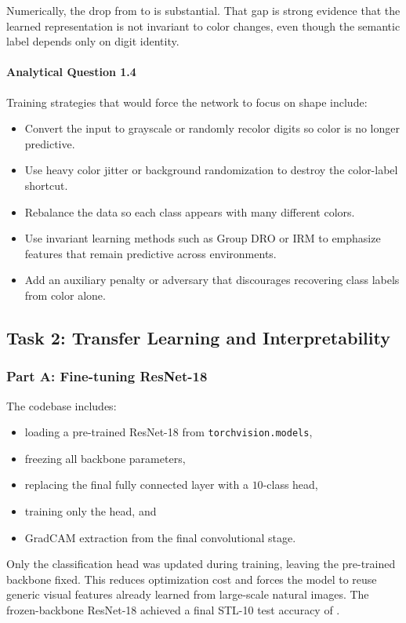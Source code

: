 \documentclass[11pt]{article}
\begin{document}
Numerically, the drop from \CMNISTBiasedAcc{} to \CMNISTUnbiasedAcc{} is substantial. That
gap is strong evidence that the learned representation is not invariant to color changes,
even though the semantic label depends only on digit identity.

\paragraph{Analytical Question 1.4}
Training strategies that would force the network to focus on shape include:
\begin{itemize}
  \item Convert the input to grayscale or randomly recolor digits so color is no longer predictive.
  \item Use heavy color jitter or background randomization to destroy the color-label shortcut.
  \item Rebalance the data so each class appears with many different colors.
  \item Use invariant learning methods such as Group DRO or IRM to emphasize features that remain predictive across environments.
  \item Add an auxiliary penalty or adversary that discourages recovering class labels from color alone.
\end{itemize}

\subsection{Task 2: Transfer Learning and Interpretability}

\subsubsection*{Part A: Fine-tuning ResNet-18}

The codebase includes:
\begin{itemize}
  \item loading a pre-trained ResNet-18 from \texttt{torchvision.models},
  \item freezing all backbone parameters,
  \item replacing the final fully connected layer with a \(10\)-class head,
  \item training only the head, and
  \item GradCAM extraction from the final convolutional stage.
\end{itemize}

Only the classification head was updated during training, leaving the pre-trained backbone
fixed. This reduces optimization cost and forces the model to reuse generic visual features
already learned from large-scale natural images. The frozen-backbone ResNet-18 achieved a
final STL-10 test accuracy of \STLTestAcc.
\end{document}
